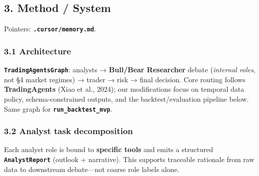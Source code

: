 \documentclass[
]{article}
\begin{document}
\subsection{3. Method / System}\label{method-system}

Pointers: \textbf{\texttt{.cursor/memory.md}}.

\subsubsection{3.1 Architecture}\label{architecture}

\textbf{\texttt{TradingAgentsGraph}}: analysts → \textbf{Bull/Bear
Researcher} debate (\emph{internal roles}, not §4 market regimes) →
trader → risk → final decision. Core routing follows
\textbf{TradingAgents} (Xiao et al., 2024); our modifications focus on
temporal data policy, schema-constrained outputs, and the
backtest/evaluation pipeline below. Same graph for
\textbf{\texttt{run\_backtest\_mvp}}.

\subsubsection{3.2 Analyst task
decomposition}\label{analyst-task-decomposition}

Each analyst role is bound to \textbf{specific tools} and emits a
structured \textbf{\texttt{AnalystReport}} (outlook + narrative). This
supports traceable rationale from raw data to downstream debate---not
coarse role labels alone.
\end{document}
